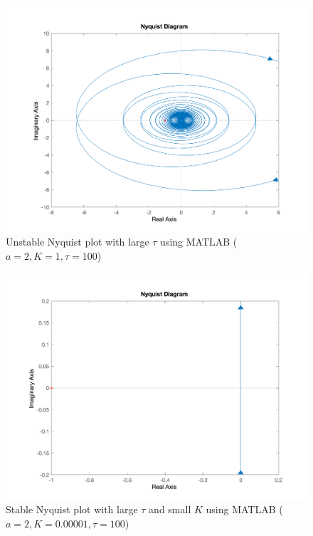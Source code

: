 \begin{figure}[H]
	\caption{Unstable Nyquist plot  with large $\tau$ using MATLAB ($a = 2, K = 1, \tau = 100$)}
	\centering
	\includegraphics[width=12cm]{../Figure/Q3/MATLAB-Nyquist_increase_tau_very_lage.png}
\end{figure}

\begin{figure}[H]
	\caption{Stable Nyquist plot with large $\tau$ and small $K$ using MATLAB ($a = 2, K = 0.00001, \tau = 100$)}
	\centering
	\includegraphics[width=12cm]{../Figure/Q3/MATLAB-Nyquist_increase_tau_very_lage_K_very_low.png}
\end{figure}




